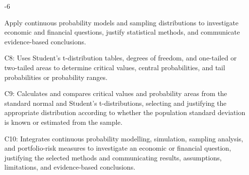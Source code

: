 \makeatletter
{}
\makeatother

\graphicspath{{./}{../}{../../}{../../../}{../../../../}{preamble/}{../preamble/}{../../preamble/}{../../../preamble/}{../../../../preamble/}}
\linespread{1.0}
\setlength{\parskip}{3pt}
\setlength{\fboxsep}{0pt}

\usepackage{needspace}
\patchcmd{\ExamHeader}{\textwidth-6cm-4\tabcolsep-4\arrayrulewidth}
{\textwidth-5.6cm-6\arrayrulewidth}{}{}
\let\VThreeSubsectionBox\SubsectionBox
\RenewDocumentCommand{\SubsectionBox}{s m}{%
\par\Needspace{5\baselineskip}%
\IfBooleanTF{#1}{\VThreeSubsectionBox*{#2}}{\VThreeSubsectionBox{#2}}%
}

\vspace{0.15cm}

\LearningObjective
{Apply continuous probability models and sampling distributions to investigate economic and financial questions, justify statistical methods, and communicate evidence-based conclusions.}
{
C8: Uses Student's t-distribution tables, degrees of freedom, and one-tailed or two-tailed areas to determine critical values, central probabilities, and tail probabilities or probability ranges.\par
C9: Calculates and compares critical values and probability areas from the standard normal and Student's t-distributions, selecting and justifying the appropriate distribution according to whether the population standard deviation is known or estimated from the sample.\par
C10: Integrates continuous probability modelling, simulation, sampling analysis, and portfolio-risk measures to investigate an economic or financial question, justifying the selected methods and communicating results, assumptions, limitations, and evidence-based conclusions.
}

\vspace{0.1cm}
\StudentInfo

